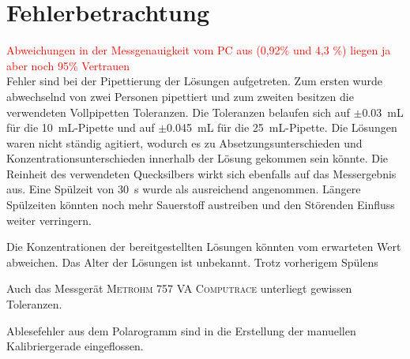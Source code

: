 \section{Fehlerbetrachtung}
\label{sec:fehler}

\textcolor{red}{Abweichungen in der Messgenauigkeit vom PC aus (0,92\% und 4,3 \%) liegen ja aber noch 95\% Vertrauen}\\

Fehler sind bei der Pipettierung der Lösungen aufgetreten. Zum ersten wurde abwechselnd von zwei Personen pipettiert und zum zweiten besitzen die verwendeten Vollpipetten Toleranzen. Die Toleranzen belaufen sich auf $\pm$\SI{0,03}{\milli\liter} für die \SI{10}{\milli\liter}-Pipette und auf $\pm$\SI{0,045}{\milli\liter} für die \SI{25}{\milli\liter}-Pipette. Die Lösungen waren nicht ständig agitiert, wodurch es zu Absetzungsunterschieden und Konzentrationsunterschieden innerhalb der Lösung gekommen sein könnte. Die Reinheit des verwendeten Quecksilbers wirkt sich ebenfalls auf das Messergebnis aus. Eine Spülzeit von \SI{30}{\second} wurde als ausreichend angenommen. Längere Spülzeiten könnten noch mehr Sauerstoff austreiben und den Störenden Einfluss weiter verringern.

Die Konzentrationen der bereitgestellten Lösungen könnten vom erwarteten Wert abweichen. Das Alter der Lösungen ist unbekannt. Trotz vorherigem Spülens

Auch das Messgerät \textsc{Metrohm 757 VA Computrace} unterliegt gewissen Toleranzen.

Ablesefehler aus dem Polarogramm sind in die Erstellung der manuellen Kalibriergerade eingeflossen.